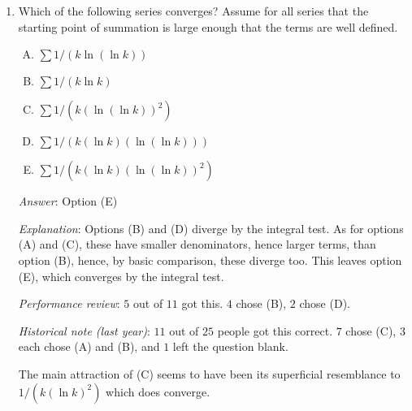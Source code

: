 \documentclass[10pt]{amsart}
\begin{document}
\begin{enumerate}
  {\em Answer}: Option (B)

  {\em Explanation}: The previous question tells us that if the degree
  of $p$ is at least three, then the series of absolutely convergent.

  If the degree of $p$ is two, then the series is conditionally
  convergent. To see this, note that $p(k)$ is always positive, so the
  summation is an alternating series summation. Also, the terms are
  eventually decreasing in magnitude, and they go to zero. Thus, by
  the alternating series theorem, the series converges. On the other
  hand, the degree difference rule tells us that it does not converge
  absolutely.

  If the degree of $p$ is one or zero, then the terms of the series do
  not approach zero, so the series does not converge.

  {\em Performance review}: $3$ out of $11$ got this. $7$ chose (C),
  $1$ chose (E).

\item Which of the following series converges? Assume for all
  series that the starting point of summation is large enough that the
  terms are well defined.

  \begin{enumerate}[(A)]
  \item $\sum 1/(k \ln (\ln k))$
  \item $\sum 1/(k \ln k)$
  \item $\sum 1/(k (\ln (\ln k))^2)$
  \item $\sum 1/(k (\ln k)(\ln (\ln k)))$
  \item $\sum 1/(k (\ln k)(\ln (\ln k))^2)$
  \end{enumerate}

  {\em Answer}: Option (E)

  {\em Explanation}: Options (B) and (D) diverge by the integral
  test. As for options (A) and (C), these have smaller denominators,
  hence larger terms, than option (B), hence, by basic comparison,
  these diverge too. This leaves option (E), which converges by the
  integral test.

  {\em Performance review}: $5$ out of $11$ got this. $4$ chose (B),
  $2$ chose (D).

  {\em Historical note (last year)}: $11$ out of $25$
  people got this correct. $7$ chose (C), $3$ each chose (A) and (B),
  and $1$ left the question blank.

  The main attraction of (C) seems to have been its superficial
  resemblance to $1/(k(\ln k)^2)$ which does converge.


\end{enumerate}
\end{document}
